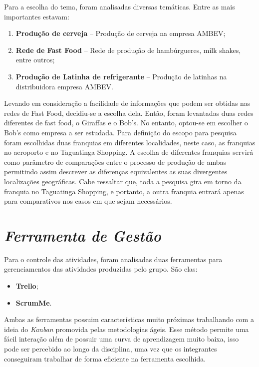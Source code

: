 		Para a escolha do tema, foram analisadas diversas temáticas. Entre as mais importantes estavam:

		\begin{enumerate}
			\item{\textbf{Produção de cerveja} – Produção de cerveja na empresa AMBEV;}
			\item{\textbf{Rede de Fast Food} – Rede de produção de hambúrgueres, milk shakes, entre outros;}
			\item{\textbf{Produção de Latinha de refrigerante} – Produção de latinhas na distribuidora empresa AMBEV.}
		\end{enumerate}

		Levando em consideração a facilidade de informações que podem ser obtidas nas redes de Fast Food, decidiu-se a escolha dela. Então, foram levantadas duas redes diferentes de fast food, o Giraffas e o Bob’s. No entanto, optou-se em escolher o Bob's como empresa a ser estudada. Para definição do escopo para pesquisa foram escolhidas duas franquias em diferentes localidades, neste caso, as franquias no aeroporto e no Taguatinga Shopping. A escolha de diferentes franquias servirá como parâmetro de comparações entre o processo de produção de ambas permitindo assim descrever as diferenças equivalentes as suas divergentes localizações geográficas. Cabe ressaltar que, toda a pesquisa gira em torno da franquia no Taguatinga Shopping, e portanto, a outra franquia entrará apenas para comparativos nos casos em que sejam necessários. 

	\section[Ferramenta de Gestão]{\emph{Ferramenta de Gestão}}
	\label{sec:informacoesGerais_ferramenta}

		Para o controle das atividades, foram analisadas duas ferramentas para gerenciamentos das atividades produzidas pelo grupo. São elas:

		\begin{itemize}
			\item{\textbf{Trello};}
			\item{\textbf{ScrumMe}.}
		\end{itemize}

		Ambas as ferramentas possuim características muito próximas trabalhando com a ideia do \emph{Kanban} promovida pelas metodologias ágeis. Esse método permite uma fácil interação além de possuir uma curva de aprendizagem muito baixa, isso pode ser percebido ao longo da disciplina, uma vez que os integrantes conseguiram trabalhar de forma eficiente na ferramenta escolhida.

